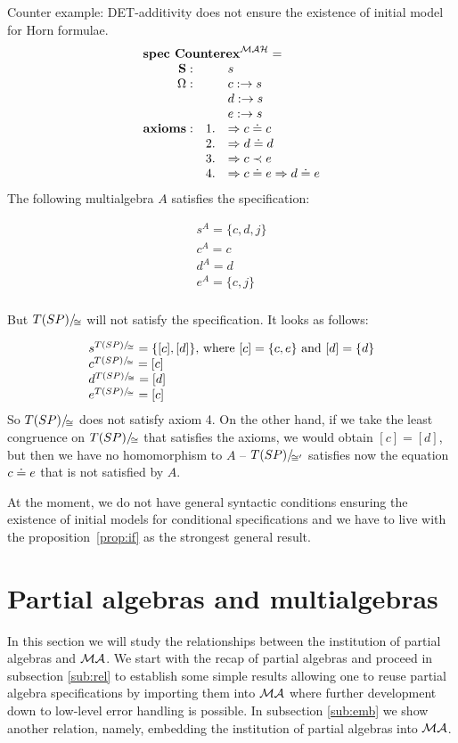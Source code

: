 \documentclass[10pt]{article}
\begin{document}
\begin{example}\label{ex:coinit}
Counter example: DET-additivity does not ensure the existence of initial model for Horn formulae.
\[ \spec{
	\tit{\mbox{\bf spec\ Counterex}^{\inst{MAH}}=} \\
		\Sorts: && s\\
		\Ops:   && c: \to s\\
			&& d:\to s\\
			&& e: \to s\\
		{\bf axioms:}			
		        &1.& \To c \eleq c\\
			&2.& \To d \eleq d\\
			&3.& \To c \prec e\\
			&4.& \To c \eleq e \To d \eleq e \\
}
\]
The following multialgebra $A$ satisfies the specification:

	\[ \begin{array}{l}
		s^A = \{ c,d,j \}\\
		c^A= c \\
		d^A= d \\
		e^A = \{c,j \} \\
	\end{array} \]

But $T(SP)/\!_{\cong}$ will not satisfy the specification. It looks as follows:

	\[ \begin{array}{l}
		s^{T(SP)/\!_{\cong}} =\{ [c], [d] \}\mbox{, where $[c] = \{c, e\}$ and $[d] = \{d\}$} \\
		c^{T(SP)/\!_{\cong}} =[c] \\
		d^{T(SP)/\!_{\cong}} =[d] \\
		e^{T(SP)/\!_{\cong}} =[c] \\
	\end{array} \]
So ${T(SP)/\!_{\cong}}$ does not satisfy axiom 4. On the other hand, if we
take the least congruence on ${T(SP)/\!_{\cong}}$ that satisfies the axioms,
we would obtain $[c]=[d]$, but then we have no homomorphism to $A$ --
${T(SP)/\!_{\cong'}}$ satisfies now the equation $c
\mathrel{\dot{=} } e$ that is not satisfied by $A$.
\end{example}
%
At the moment, we do not have general syntactic conditions ensuring the
existence of initial models for conditional specifications and we have to live with the
proposition~\ref{prop:if} as the strongest general result. 

\section{Partial algebras and multialgebras}\label{se:partial}
In this section we will study the relationships between the institution of
partial algebras and ${\mathcal{MA}}$. We start with the recap of partial algebras
and proceed in subsection \ref{sub:rel} to establish some simple results
allowing one to reuse partial algebra specifications by importing them into
${\mathcal{MA}}$ where further development down to low-level error handling is
possible. In subsection \ref{sub:emb} we show another relation, namely,
embedding the institution of partial algebras into ${\mathcal{MA}}$.
\end{document}
